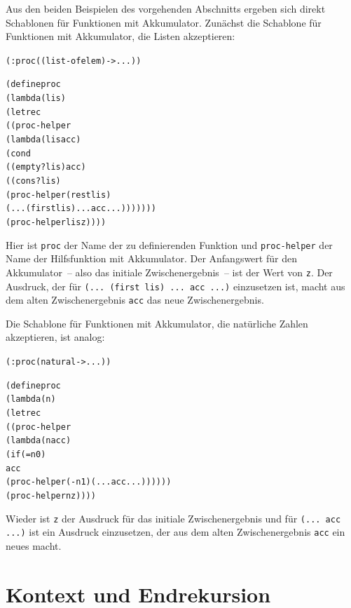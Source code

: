 Aus den beiden Beispielen des vorgehenden Abschnitts ergeben sich
direkt Schablonen für Funktionen mit Akkumulator.  Zunächst die
Schablone für Funktionen mit Akkumulator, die Listen akzeptieren:
%
\begin{alltt}
(: proc ((list-of elem) -> ...))

(define proc
  (lambda (lis)
    (letrec
       ((proc-helper
         (lambda (lis acc)
            (cond
              ((empty? lis) acc)
              ((cons? lis)
                 (proc-helper (rest lis)
                    (... (first lis) ... acc ...)))))))
    (proc-helper lis z))))
\end{alltt}
%
Hier ist \texttt{proc} der Name der zu definierenden Funktion
und \texttt{proc-helper} der Name der Hilfsfunktion mit
Akkumulator.  Der Anfangswert für den Akkumulator~-- also das initiale
Zwischenergebnis~-- ist der Wert von \texttt{z}.  Der
Ausdruck, der für \texttt{(... (first lis) ... acc ...)} einzusetzen
ist, macht aus dem alten Zwischenergebnis \texttt{acc} das neue
Zwischenergebnis.

Die Schablone für Funktionen mit Akkumulator, die natürliche Zahlen
akzeptieren, ist analog:
%
\begin{alltt}
(: proc (natural -> ...))

(define proc
  (lambda (n)
    (letrec
      ((proc-helper
        (lambda (n acc)
          (if (= n 0)
              acc
              (proc-helper (- n 1) (... acc ...))))))
    (proc-helper n z))))
\end{alltt}
%
Wieder ist \texttt{z} der Ausdruck für das initiale Zwischenergebnis
und für \texttt{(... acc ...)} ist ein Ausdruck einzusetzen, der aus
dem alten Zwischenergebnis \texttt{acc} ein neues macht.

\section{Kontext und Endrekursion}
\label{sec:iteration}

